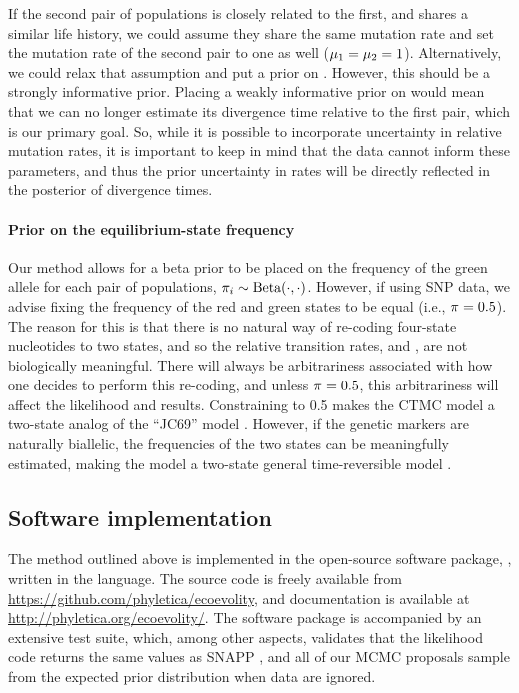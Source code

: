 If the second pair of populations is closely related to the first, and shares a
similar life history, we could assume they share the same mutation rate and
set the mutation rate of the second pair to one as well ($\murate[1] = \murate[2] = 1$).
Alternatively, we could relax that assumption and put a prior on \murate[2].
However, this should be a strongly informative prior.
Placing a weakly informative prior on \murate[2] would mean that we can no
longer estimate its divergence time relative to the first pair,
which is our primary goal.
So, while it is possible to incorporate uncertainty in relative mutation rates,
it is important to keep in mind that the data cannot inform these parameters,
and thus the prior uncertainty in rates will be directly reflected in the
posterior of divergence times.

\paragraph{Prior on the equilibrium-state frequency}
Our method allows for a beta prior to be placed on the frequency of the green
allele for each pair of populations,
$\gfreq[i] \sim \textrm{Beta}(\cdot, \cdot)$.
However, if using SNP data, we advise fixing the frequency of the red and green
states to be equal (i.e., $\gfreq = 0.5$).
The reason for this is that there is no natural way of re-coding four-state
nucleotides to two states, and so the relative transition rates, \rgmurate and
\grmurate, are not biologically meaningful.
There will always be arbitrariness associated with how one decides to perform
this re-coding, and unless $\gfreq = 0.5$, this arbitrariness will affect the
likelihood and results.
Constraining \gfreq to 0.5 makes the CTMC model a two-state analog of the
``JC69'' model \citep{JC1969}.
However, if the genetic markers are naturally biallelic, the frequencies of the
two states can be meaningfully estimated, making the model a two-state general
time-reversible model \citep{Tavare1986}.



\subsection{Software implementation}
The method outlined above is implemented in the open-source software package,
\ecoevolity, written in the \cpp language.
The source code is freely available from
\url{https://github.com/phyletica/ecoevolity}, and documentation is available
at
\url{http://phyletica.org/ecoevolity/}.
The software package is accompanied by an extensive test suite, which, among
other aspects,
validates that the likelihood code returns the same values
as
SNAPP \citep{Bryant2012},
and all of our MCMC proposals sample from the expected prior distribution
when data are ignored.

